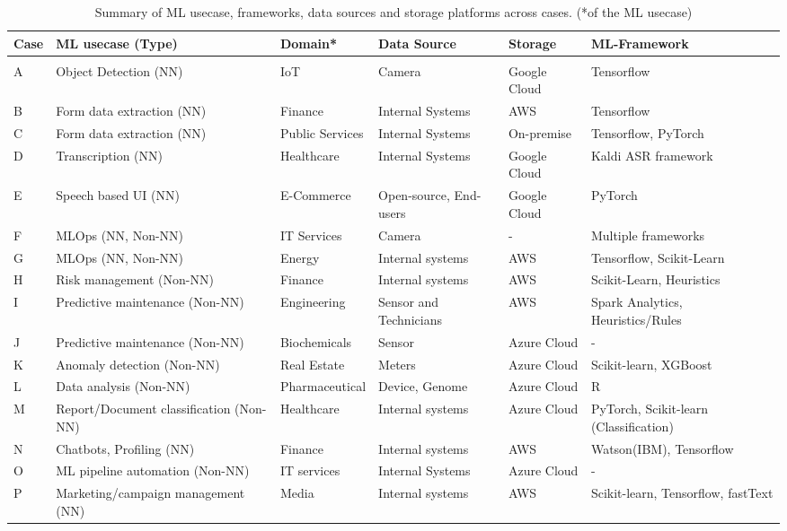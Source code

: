 \begin{table*}[t]
  \centering
  \caption{Summary of ML usecase, frameworks, data sources and storage platforms across cases. (*of the ML usecase)}
  \begin{tabular}{p{}p{}p{2cm}p{}p{}p{}}
    \toprule
    \textbf{Case} & \textbf{ML usecase (Type)} & \textbf{Domain*} &\textbf{Data Source} & \textbf{Storage} & \textbf{ML-Framework} \\
    \toprule \\
    A & Object Detection (NN) & IoT & Camera & Google Cloud & Tensorflow \\
    B & Form data extraction  (NN) & Finance & Internal Systems & AWS & Tensorflow \\
    C & Form data extraction (NN) & Public Services & Internal Systems & On-premise & Tensorflow, PyTorch \\
    D & Transcription (NN) & Healthcare & Internal Systems & Google Cloud & Kaldi ASR framework \\
    E & Speech based UI (NN) & E-Commerce & Open-source, End-users & Google Cloud & PyTorch \\
    F & MLOps (NN, Non-NN) & IT Services & Camera  & - & Multiple frameworks \\
    G & MLOps (NN, Non-NN)  & Energy & Internal systems & AWS & Tensorflow, Scikit-Learn \\
    H & Risk management (Non-NN) & Finance & Internal systems & AWS & Scikit-Learn, Heuristics \\
    I & Predictive maintenance (Non-NN) & Engineering & Sensor and Technicians & AWS &  Spark Analytics, Heuristics/Rules \\
    J & Predictive maintenance (Non-NN) & Biochemicals & Sensor & Azure Cloud & - \\
    K & Anomaly detection (Non-NN) & Real Estate & Meters & Azure Cloud & Scikit-learn, XGBoost \\
    L & Data analysis (Non-NN) & Pharmaceutical & Device,  Genome & Azure Cloud & R \\
    M & Report/Document classification (Non-NN) & Healthcare & Internal systems & Azure Cloud & PyTorch, Scikit-learn (Classification) \\
    N & Chatbots, Profiling (NN) & Finance & Internal systems & AWS & Watson(IBM), Tensorflow \\
    O & ML pipeline automation (Non-NN) & IT services & Internal Systems & Azure Cloud & - \\
    P & Marketing/campaign management (NN) & Media & Internal systems & AWS & Scikit-learn, Tensorflow, fastText \\
    \hline
    \end{tabular}%
  \label{tab:data_source_storage_mlframeworks}%
\end{table*}%
